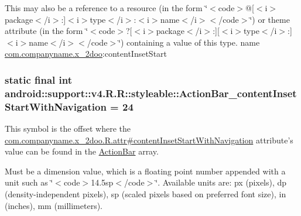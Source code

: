 This may also be a reference to a resource (in the form \char`\"{}$<$code$>$@\mbox{[}$<$i$>$package$<$/i$>$:\mbox{]}$<$i$>$type$<$/i$>$:$<$i$>$name$<$/i$>$$<$/code$>$\char`\"{}) or theme attribute (in the form \char`\"{}$<$code$>$?\mbox{[}$<$i$>$package$<$/i$>$:\mbox{]}\mbox{[}$<$i$>$type$<$/i$>$:\mbox{]}$<$i$>$name$<$/i$>$$<$/code$>$\char`\"{}) containing a value of this type.  name \hyperlink{namespacecom_1_1companyname_1_1x__2doo}{com.companyname.x\_\-2doo}:contentInsetStart \hypertarget{classandroid_1_1support_1_1v4_1_1_r_1_1styleable_b66f0db25dbaa8260940ed3b91d9d0c5}{
\subsubsection[{ActionBar\_\-contentInsetStartWithNavigation}]{\setlength{\rightskip}{0pt plus 5cm}static final int android::support::v4.R.R::styleable::ActionBar\_\-contentInsetStartWithNavigation = 24}}
\label{classandroid_1_1support_1_1v4_1_1_r_1_1styleable_b66f0db25dbaa8260940ed3b91d9d0c5}


This symbol is the offset where the \hyperlink{classcom_1_1companyname_1_1x__2doo_1_1_r_1_1attr_dc8987105bb00e0753b0e251a2e2c21e}{com.companyname.x\_\-2doo.R.attr\#contentInsetStartWithNavigation} attribute's value can be found in the \hyperlink{classandroid_1_1support_1_1v4_1_1_r_1_1styleable_5c6cf2c83551ebae05f365bb913fdddf}{ActionBar} array.

Must be a dimension value, which is a floating point number appended with a unit such as \char`\"{}$<$code$>$14.5sp$<$/code$>$\char`\"{}. Available units are: px (pixels), dp (density-independent pixels), sp (scaled pixels based on preferred font size), in (inches), mm (millimeters). 

